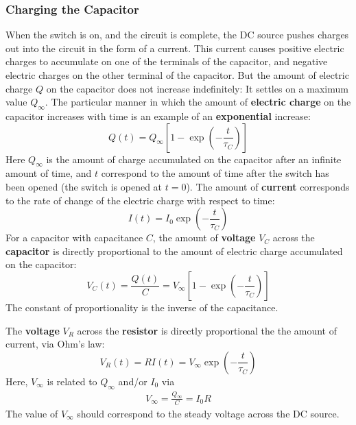 \subsubsection{Charging the Capacitor}
%
When the switch is on, and the circuit is complete, the DC source pushes charges out into the circuit in the form of a current. This current causes positive electric charges to accumulate on one of the terminals of the capacitor, and negative electric charges on the other terminal of the capacitor. But the amount of electric charge $Q$ on the capacitor does not increase indefinitely: It settles on a maximum value $Q_{\infty}$. The particular manner in which the amount of \textbf{electric charge} on the capacitor increases with time is an example of an \textbf{exponential} increase:
\begin{equation}
    Q(t) = Q_{\infty} \left[ 1 - \exp\left(-\frac{t}{\tau_{C}}\right) \right]
    \label{eq.05.RC.q.charging}
\end{equation}
Here $Q_{\infty}$ is the amount of charge accumulated on the capacitor after an infinite amount of time, and $t$ correspond to the amount of time after the switch has been opened (the switch is opened at $t = 0$). The amount of \textbf{current} corresponds to the rate of change of the electric charge with respect to time:
\begin{equation}
    I(t) = I_{0} \exp\left(-\frac{t}{\tau_{C}}\right)
    \label{eq.05.RC.i.charging}
\end{equation}
For a capacitor with capacitance $C$, the amount of \textbf{voltage} $V_{C}$ across the \textbf{capacitor} is directly proportional to the amount of electric charge accumulated on the capacitor:
\begin{equation}
    V_{C}(t) = \frac{Q(t)}{C} = V_{\infty} \left[ 1 - \exp\left(-\frac{t}{\tau_{C}}\right) \right]
    \label{eq.05.RC.vC.charging}
\end{equation}
The constant of proportionality is the inverse of the capacitance.

The \textbf{voltage} $V_{R}$ across the \textbf{resistor} is directly proportional the the amount of current, via Ohm's law:
\begin{equation}
    V_{R}(t) = R I(t) = V_{\infty} \exp\left(-\frac{t}{\tau_{C}}\right)
    \label{eq.05.RC.vR.charging}
\end{equation}
Here, $V_{\infty}$ is related to $Q_{\infty}$ and/or $I_{0}$ via
\begin{eqnarray}
    V_{\infty} = \frac{Q_{\infty}}{C} = I_{0} R
\end{eqnarray}
The value of $V_{\infty}$ should correspond to the steady voltage across the DC source.

